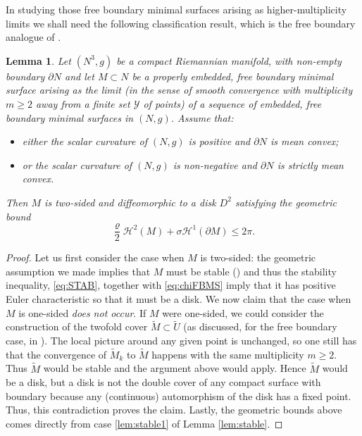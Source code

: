 \documentclass[JEP,XML,SOM,Unicode]{cedram}
\let\mathcal\mathscr
\newcounter{cas}
\newtheorem{lem}[thm]{Lemma}
\theoremstyle{definition}
\newcommand{\h}{\mathscr{H}}
\begin{document}
In studying those free boundary minimal surfaces arising as higher-multiplicity limits we shall need the following classification result, which is the free boundary analogue of \cite[Lem.\,14]{ABCS18}.

\begin{lem}\label{lem:stable-type}
Let $(N^3,g)$ be a compact Riemannian manifold, with non-empty boundary $\partial N$ and let $M\subset N$ be a properly embedded, free boundary minimal surface arising as the limit (in the sense of smooth convergence with multiplicity $m\geq 2$ away from a finite set $\mathcal{Y}$ of points) of a sequence of embedded, free boundary minimal surfaces in $(N,g)$.
Assume that:
\begin{itemize}
\item
\emph{either} the scalar curvature of $(N,g)$ is positive and $\partial N$ is mean convex;
\item
\emph{or} the scalar curvature of $(N,g)$ is non-negative and $\partial N$ is strictly mean convex.
\end{itemize}
Then $M$ is two-sided and diffeomorphic to a disk $D^2$ satisfying the geometric bound
\[
\frac{\varrho}{2}\h^2(M)+\sigma\h^1(\partial M)\leq 2\pi.
\]
\end{lem}

\begin{proof}
Let us first consider the case when $M$ is two-sided: the geometric assumption we made implies that $M$ must be stable (\cf \cite[\S5]{ACS17}) and thus the stability inequality, \cf \eqref{eq:STAB}, together with \eqref{eq:chiFBMS}
imply that it has positive Euler characteristic so that it must be a disk.
We now claim that the case when $M$ is one-sided \emph{does not occur}. If $M$ were one-sided, we could consider the construction of the twofold cover $\widetilde{M}\subset\widetilde{U}$ (as discussed, for the free boundary case, in \cite[\S6]{ACS17}).
The local picture around any given point is unchanged, so one still has that the convergence of $\widetilde{M}_k$ to $\widetilde{M}$ happens with the same multiplicity $m\geq 2$. Thus $\widetilde{M}$ would be stable and the argument above would apply. Hence $\widetilde{M}$ would be a disk, but a disk is not the double cover of any compact surface with boundary because any (continuous) automorphism of the disk has a fixed point. Thus, this contradiction proves the claim.
Lastly, the geometric bounds above comes directly from case \eqref{lem:stable1} of Lemma \ref{lem:stable}.
\end{proof}

\backmatter


\end{document}
